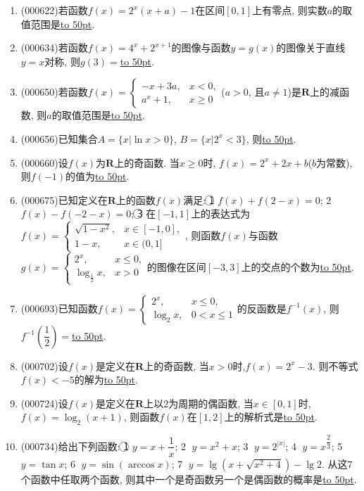 \documentclass[10pt,a4paper]{article}
\newcommand{\blank}[1]{\underline{\hbox to #1pt{}}}
\begin{document}
\begin{enumerate}[1.]
\item {\tiny (000622)}若函数$f(x)=2^x(x+a)-1$在区间$[0,1]$上有零点, 则实数$a$的取值范围是\blank{50}.
\item {\tiny (000634)}若函数$f(x)=4^x+2^{x+1}$的图像与函数$y=g(x)$的图像关于直线$y=x$对称, 则$g(3)=$\blank{50}.
\item {\tiny (000650)}若函数$f(x)=\begin{cases} -x+3a, & x<0,  \\ a^x+1, & x\ge 0 \end{cases}$($a>0$, 且$a\ne 1$)是$\mathbf{R}$上的减函数, 则$a$的取值范围是\blank{50}.
\item {\tiny (000656)}已知集合$A=\{x|\ln x>0 \}$, $B=\{x|2^x<3\}$, 则\blank{50}.
\item {\tiny (000660)}设$f(x)$为$\mathbf{R}$上的奇函数. 当$x\ge 0$时, $f(x)=2^x+2x+b$($b$为常数), 则$f(-1)$的值为\blank{50}.
\item {\tiny (000675)}已知定义在$\mathbf{R}$上的函数$f(x)$满足: \textcircled{1} $f(x)+f(2-x)=0$; \textcircled{2} $f(x)-f(-2-x)=0$; \textcircled{3} 在$[-1,1]$上的表达式为$f(x)=\begin{cases} \sqrt{1-x^2}, & x\in [-1,0], \\ 1-x, & x\in (0,1] \end{cases}$, 则函数$f(x)$与函数$g(x)=\begin{cases} 2^x, & x\le 0, \\ \log_{\frac12} x,& x>0 \end{cases}$的图像在区间$[-3,3]$上的交点的个数为\blank{50}.
\item {\tiny (000693)}已知函数$f(x)=\begin{cases}2^x, & x\le 0, \\ \log_2 x, & 0<x\le 1\end{cases}$的反函数是$f^{-1}(x)$, 则$f^{-1}(\dfrac12)=$\blank{50}.
\item {\tiny (000702)}设$f(x)$是定义在$\mathbf{R}$上的奇函数, 当$x>0$时,$f(x)=2^x-3$. 则不等式$f(x)<-5$的解为\blank{50}.
\item {\tiny (000724)}设$f(x)$是定义在$\mathbf{R}$上以$2$为周期的偶函数, 当$x\in [0,1]$时, $f(x)=\log_2(x+1)$, 则函数$f(x)$在$[1,2]$上的解析式是\blank{50}.
\item {\tiny (000734)}给出下列函数: \textcircled{1} $y=x+\dfrac1x$; \textcircled{2} $y={x^2}+x$; \textcircled{3} $y={2^{|x|}}$; \textcircled{4} $y={x^{\dfrac23}}$; \textcircled{5} $y=\tan x$; \textcircled{6} $y=\sin(\arccos x)$; \textcircled{7} $y=\lg(x+\sqrt{{x^2}+4})-\lg 2$. 从这$7$个函数中任取两个函数, 则其中一个是奇函数另一个是偶函数的概率是\blank{50}.

\end{enumerate}
\end{document}
